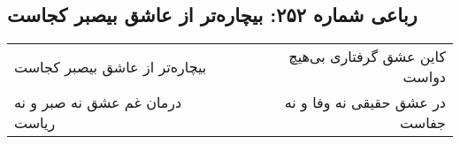 \begin{center}
\section*{رباعی شماره ۲۵۲: بیچاره‌تر از عاشق بیصبر کجاست}
\label{sec:0252}
\begin{longtable}{l p{0.5cm} r}
بیچاره‌تر از عاشق بیصبر کجاست
&&
کاین عشق گرفتاری بی‌هیچ دواست
\\
درمان غم عشق نه صبر و نه ریاست
&&
در عشق حقیقی نه وفا و نه جفاست
\\
\end{longtable}
\end{center}
